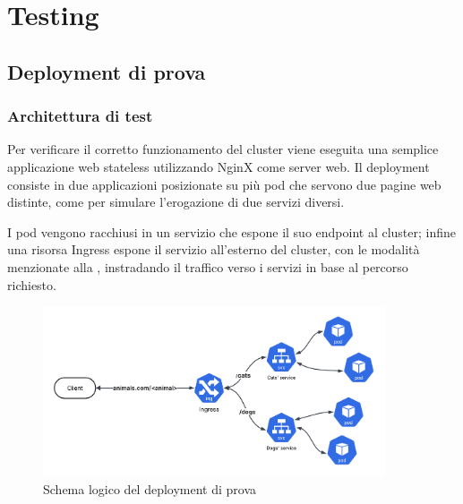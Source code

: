 \documentclass[12pt,a4paper,openright,twoside]{book}
\begin{document}
\chapter{Testing}
\section{Deployment di prova}
\subsection{Architettura di test}
\label{sec:test-depl}
Per verificare il corretto funzionamento del cluster viene eseguita una semplice applicazione web stateless utilizzando NginX come server web. Il deployment consiste in due applicazioni
posizionate su più pod che servono due pagine web distinte, come per simulare l'erogazione di due servizi diversi.

I pod vengono racchiusi in un servizio che espone il suo endpoint al cluster; infine una risorsa Ingress espone il servizio all'esterno del cluster,
con le modalità menzionate alla , instradando il traffico verso i servizi in base al percorso richiesto.
\begin{figure}[!hbt]
    \centering
    \includegraphics[width=0.9\textwidth]{figures/test-deployment.png}
    \caption{Schema logico del deployment di prova}
    \label{fig:test-deployment}
\end{figure}
\FloatBarrier
\end{document}
